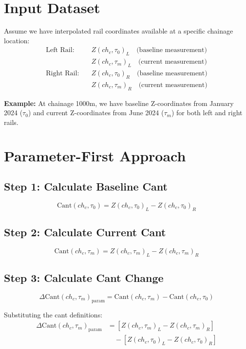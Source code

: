 \documentclass{article}
\begin{document}
\section{Input Dataset}
Assume we have interpolated rail coordinates available at a specific chainage location:
\begin{align}
\text{Left Rail:} \quad &Z(ch_c, \tau_0)_L \quad \text{(baseline measurement)} \\
&Z(ch_c, \tau_m)_L \quad \text{(current measurement)} \\[0.5em]
\text{Right Rail:} \quad &Z(ch_c, \tau_0)_R \quad \text{(baseline measurement)} \\
&Z(ch_c, \tau_m)_R \quad \text{(current measurement)}
\end{align}

\textbf{Example:} At chainage 1000m, we have baseline Z-coordinates from January 2024 ($\tau_0$) and current Z-coordinates from June 2024 ($\tau_m$) for both left and right rails.

\section{Parameter-First Approach}

\subsection{Step 1: Calculate Baseline Cant}
\begin{equation}
\text{Cant}(ch_c, \tau_0) = Z(ch_c, \tau_0)_L - Z(ch_c, \tau_0)_R
\end{equation}

\subsection{Step 2: Calculate Current Cant}
\begin{equation}
\text{Cant}(ch_c, \tau_m) = Z(ch_c, \tau_m)_L - Z(ch_c, \tau_m)_R
\end{equation}

\subsection{Step 3: Calculate Cant Change}
\begin{equation}
\Delta\text{Cant}(ch_c, \tau_m)_{\text{param}} = \text{Cant}(ch_c, \tau_m) - \text{Cant}(ch_c, \tau_0)
\end{equation}

Substituting the cant definitions:
\begin{align}
\Delta\text{Cant}(ch_c, \tau_m)_{\text{param}} &= [Z(ch_c, \tau_m)_L - Z(ch_c, \tau_m)_R] \nonumber \\
&\quad - [Z(ch_c, \tau_0)_L - Z(ch_c, \tau_0)_R]
\end{align}
\end{document}
